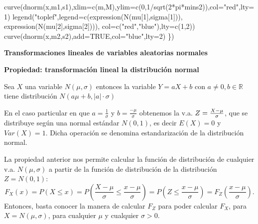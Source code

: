\documentclass[
  letterpaper,
  DIV=11,
  numbers=noendperiod]{scrreprt}
\newenvironment{Shaded}{\begin{snugshade}}{\end{snugshade}}
\newcommand{\AttributeTok}[1]{\textcolor[rgb]{0.40,0.45,0.13}{#1}}
\newcommand{\ConstantTok}[1]{\textcolor[rgb]{0.56,0.35,0.01}{#1}}
\newcommand{\DecValTok}[1]{\textcolor[rgb]{0.68,0.00,0.00}{#1}}
\newcommand{\FunctionTok}[1]{\textcolor[rgb]{0.28,0.35,0.67}{#1}}
\newcommand{\NormalTok}[1]{\textcolor[rgb]{0.00,0.23,0.31}{#1}}
\newcommand{\SpecialCharTok}[1]{\textcolor[rgb]{0.37,0.37,0.37}{#1}}
\newcommand{\StringTok}[1]{\textcolor[rgb]{0.13,0.47,0.30}{#1}}
\begin{document}
\begin{Shaded}
\begin{Highlighting}[]
\FunctionTok{curve}\NormalTok{(}\FunctionTok{dnorm}\NormalTok{(x,m1,s1),}\AttributeTok{xlim=}\FunctionTok{c}\NormalTok{(m,M),}\AttributeTok{ylim=}\FunctionTok{c}\NormalTok{(}\DecValTok{0}\NormalTok{,}\DecValTok{1}\SpecialCharTok{/}\FunctionTok{sqrt}\NormalTok{(}\DecValTok{2}\SpecialCharTok{*}\NormalTok{pi}\SpecialCharTok{*}\NormalTok{mins2)),}\AttributeTok{col=}\StringTok{"red"}\NormalTok{,}\AttributeTok{lty=}\DecValTok{1}\NormalTok{)}
\FunctionTok{legend}\NormalTok{(}\StringTok{"toplef"}\NormalTok{,}\AttributeTok{legend=}\FunctionTok{c}\NormalTok{(}\FunctionTok{expression}\NormalTok{(}\FunctionTok{N}\NormalTok{(mu[}\DecValTok{1}\NormalTok{],sigma[}\DecValTok{1}\NormalTok{])),}
                         \FunctionTok{expression}\NormalTok{(}\FunctionTok{N}\NormalTok{(mu[}\DecValTok{2}\NormalTok{],sigma[}\DecValTok{2}\NormalTok{]))),}
       \AttributeTok{col=}\FunctionTok{c}\NormalTok{(}\StringTok{"red"}\NormalTok{,}\StringTok{"blue"}\NormalTok{),}\AttributeTok{lty=}\FunctionTok{c}\NormalTok{(}\DecValTok{1}\NormalTok{,}\DecValTok{2}\NormalTok{))}
\FunctionTok{curve}\NormalTok{(}\FunctionTok{dnorm}\NormalTok{(x,m2,s2),}\AttributeTok{add=}\ConstantTok{TRUE}\NormalTok{,}\AttributeTok{col=}\StringTok{"blue"}\NormalTok{,}\AttributeTok{lty=}\DecValTok{2}\NormalTok{)}
\NormalTok{\})}
\end{Highlighting}
\end{Shaded}

\textbf{Transformaciones lineales de variables aleatorias normales}

\textbf{Propiedad: transformación lineal la distribución normal}

Sea \(X\) una variable \(N(\mu,\sigma)\) entonces la variable
\(Y=a X+b\) con \(a\not=0,b\in\mathbb{R}\) tiene distribución
\(N(a\mu+b, |a|\cdot\sigma)\)

En el caso particular en que \(a=\frac1{\sigma}\) y
\(b= \frac{-\mu}{\sigma}\) obtenemos la v.a.
\(Z={{X-\mu}\over {\sigma}}\), que se distribuye según una normal
estándar \(N(0,1)\), es decir \(E(X)=0\) y \(Var(X)=1\). Dicha operación
se denomina estandarización de la distribución normal.

La propiedad anterior nos permite calcular la función de distribución de
cualquier v.a. \(N(\mu,\sigma)\) a partir de la función de distribución
de la distribución \(Z=N(0,1)\): \[
F_X(x)=P(X\leq x)=P\left(\frac{X-\mu}{\sigma}\leq \frac{x-\mu}{\sigma}\right)=P\left(Z\leq \frac{x-\mu}{\sigma}\right)=F_Z \left(\frac{x-\mu}{\sigma}\right).
\] Entonces, basta conocer la manera de calcular \(F_Z\) para poder
calcular \(F_X\), para \(X=N(\mu,\sigma)\), para cualquier \(\mu\) y
cualquier \(\sigma>0\).
\end{document}
